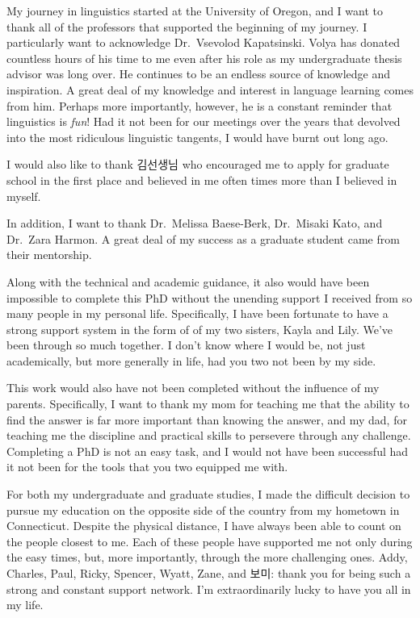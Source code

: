 \documentclass[
  12pt,
  letterpaper,
]{scrreport}
\begin{document}
My journey in linguistics started at the University of Oregon, and I
want to thank all of the professors that supported the beginning of my
journey. I particularly want to acknowledge Dr.~Vsevolod Kapatsinski.
Volya has donated countless hours of his time to me even after his role
as my undergraduate thesis advisor was long over. He continues to be an
endless source of knowledge and inspiration. A great deal of my
knowledge and interest in language learning comes from him. Perhaps more
importantly, however, he is a constant reminder that linguistics is
\emph{fun}! Had it not been for our meetings over the years that
devolved into the most ridiculous linguistic tangents, I would have
burnt out long ago.

I would also like to thank 김선생님 who encouraged me to apply for
graduate school in the first place and believed in me often times more
than I believed in myself.

In addition, I want to thank Dr.~Melissa Baese-Berk, Dr.~Misaki Kato,
and Dr.~Zara Harmon. A great deal of my success as a graduate student
came from their mentorship.

Along with the technical and academic guidance, it also would have been
impossible to complete this PhD without the unending support I received
from so many people in my personal life. Specifically, I have been
fortunate to have a strong support system in the form of of my two
sisters, Kayla and Lily. We've been through so much together. I don't
know where I would be, not just academically, but more generally in
life, had you two not been by my side.

This work would also have not been completed without the influence of my
parents. Specifically, I want to thank my mom for teaching me that the
ability to find the answer is far more important than knowing the
answer, and my dad, for teaching me the discipline and practical skills
to persevere through any challenge. Completing a PhD is not an easy
task, and I would not have been successful had it not been for the tools
that you two equipped me with.

For both my undergraduate and graduate studies, I made the difficult
decision to pursue my education on the opposite side of the country from
my hometown in Connecticut. Despite the physical distance, I have always
been able to count on the people closest to me. Each of these people
have supported me not only during the easy times, but, more importantly,
through the more challenging ones. Addy, Charles, Paul, Ricky, Spencer,
Wyatt, Zane, and 보미: thank you for being such a strong and constant
support network. I'm extraordinarily lucky to have you all in my life.
\end{document}
